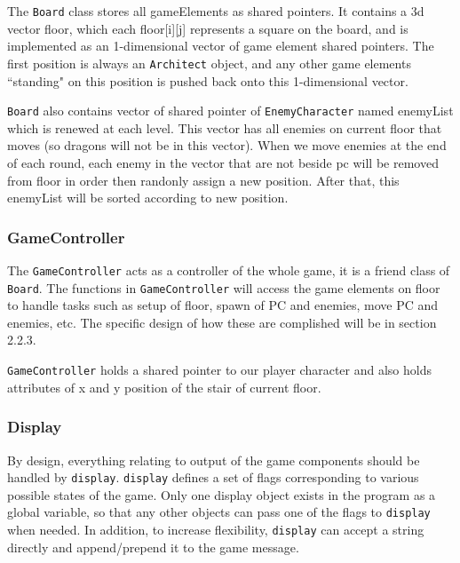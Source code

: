 \documentclass[11pt]{article}
\theoremstyle{plain} \newtheorem{theorem*}{Theorem}[subsection]
\begin{document}
The \texttt{Board} class stores all gameElements as shared pointers. 
It contains a 3d vector \textsf{floor}, which each 
\textsf{floor[i][j]} represents a square on the board, and is implemented as an
1-dimensional vector of game element shared pointers. The first position is
always an \texttt{Architect} object, 
and any other game elements ``standing" on this
position is pushed back onto this 1-dimensional vector.

\texttt{Board} also contains vector of shared pointer of 
\texttt{EnemyCharacter} named \textsf{enemyList} which is renewed at each level.
This vector has all enemies on current \textsf{floor} that moves 
(so dragons will not be in this vector).
When we move enemies at the end of each round, each enemy in the vector 
that are not beside pc will
be removed from \textsf{floor} in order then randonly assign a new position.
After that, this \textsf{enemyList} will be sorted according to new position.



\subsubsection{GameController}

The \texttt{GameController} acts as a controller of the whole game,
it is a friend class of \texttt{Board}. 
The functions in \texttt{GameController} will access
the game elements on \textsf{floor} to handle tasks such as setup of
\textsf{floor}, spawn of PC and enemies, move PC and enemies, etc.  The
specific design of how these are complished will be in section 2.2.3.

\texttt{GameController} holds a shared pointer to our player character and also
holds attributes of x and y position of the stair of current floor.

\subsubsection{Display} 

By design, everything relating to output of the game
components should be handled by \texttt{display}. \texttt{display} defines a
set of flags corresponding to various possible states of the game. Only one
display object exists in the program as a global variable, so that any other
objects can pass one of the flags to \texttt{display} when needed.  In
addition, to increase flexibility, \texttt{display} can accept a string
directly and append/prepend it to the game message.\\
\end{document}

